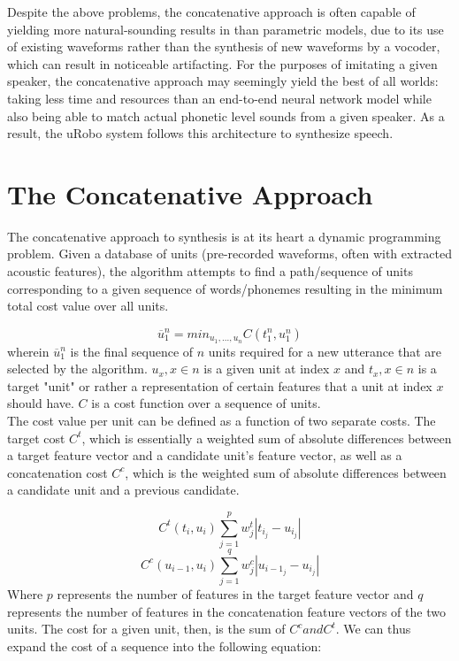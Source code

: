 \documentclass[10pt, journal, compsoc]{IEEEtran}
\begin{document}
Despite the above problems, the concatenative approach is often capable of yielding more natural-sounding results in than parametric models, due to its use of existing waveforms rather than the synthesis of new waveforms by a vocoder, which can result in noticeable  artifacting. For the purposes of imitating a given speaker, the concatenative approach may seemingly yield the best of all worlds: taking less time and resources than an end-to-end neural network model while also being able to match actual phonetic level sounds from a given speaker. As a result, the uRobo system follows this architecture to synthesize speech.  
\section{The Concatenative Approach}
The concatenative approach to synthesis is at its heart a dynamic programming problem. Given a database of units (pre-recorded waveforms, often with extracted acoustic features), the algorithm attempts to find a path/sequence of units corresponding to a given sequence of words/phonemes resulting in the minimum total cost value over all units. \par
\begin{equation}\overline{u}_1^n=min_{u_1,...,u_n}C(t_1^n,u_1^n)
\end{equation}
wherein $\overline{u}_1^n$ is the final sequence of $n$ units required for a new utterance that are selected by the algorithm. $u_x, x\in n$ is a given unit at index $x$ and $t_x, x\in n$ is a target "unit" or rather a representation of certain features that a unit at index $x$ should have. $C$ is a cost function over a sequence of units.\\	
The cost value per unit can be defined as a function of two separate costs. The target cost $C^t$, which is essentially a weighted sum of absolute differences between a target feature vector and a candidate unit's feature vector, as well as a concatenation cost $C^c$, which is the weighted sum of absolute differences between a candidate unit and a previous candidate.\par
\begin{equation}
C^t(t_i,u_i)\sum_{j=1}^pw_j^t|t_{i_j}-u_{i_j}|
\end{equation}
\begin{equation}
C^c(u_{i-1},u_i)\sum_{j=1}^qw_j^c|u_{i-1_j}-u_{i_j}|
\end{equation}
Where $p$ represents the number of features in the target feature vector and $q$ represents the number of features in the concatenation feature vectors of the two units. The cost for a given unit, then, is the sum of $C^c and C^t$. We can thus expand the cost of a sequence into the following equation:\par
\end{document}
